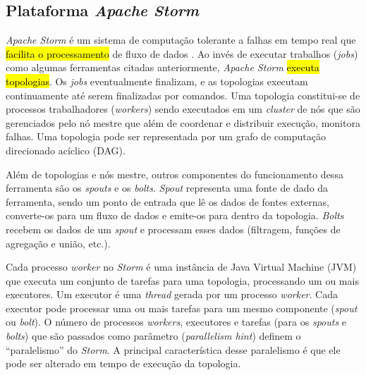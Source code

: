 \subsection{Plataforma \emph{Apache Storm}}

\emph{Apache Storm} é um sistema de computação tolerante a falhas em tempo
real que \hl{facilita o processamento} de fluxo de dados
\cite{ApacheStorm2020,Lopez2018}.
Ao invés de executar trabalhos (\emph{jobs}) como algumas ferramentas citadas
anteriormente, \emph{Apache Storm} \hl{executa topologias}.
Os \emph{jobs} eventualmente finalizam, e as topologias executam continuamente até
serem finalizadas por comandos.
Uma topologia constitui-se de processos trabalhadores (\emph{workers}) sendo executados
em um \emph{cluster} de nós que são gerenciados pelo nó mestre que além de
coordenar e distribuir execução, monitora falhas.
Uma topologia pode ser representada por um grafo de computação direcionado
acíclico (DAG).

Além de topologias e nós mestre, outros componentes do funcionamento dessa
ferramenta são os \emph{spouts} e os \emph{bolts}.
\emph{Spout} representa uma fonte de dado da ferramenta, sendo um ponto de
entrada que lê os dados de fontes externas, converte-os para um fluxo de dados e
emite-os para dentro da topologia.
\emph{Bolts} recebem os dados de um \emph{spout} e processam esses dados
(filtragem, funções de agregação e união, etc.).

Cada processo \emph{worker} no \emph{Storm} é uma instância de Java Virtual Machine (JVM)
que executa um conjunto de tarefas para uma topologia, processando um ou mais
executores.
Um executor é uma \emph{thread} gerada por um processo \emph{worker}.
Cada executor pode processar uma ou mais tarefas para um mesmo componente
(\emph{spout} ou \emph{bolt}).
O número de processos \emph{workers}, executores e tarefas (para os
\emph{spouts} e \emph{bolts}) que são passados como parâmetro (\emph{parallelism
hint}) definem o ``paralelismo'' do \emph{Storm}. A principal característica desse
paralelismo é que ele pode ser alterado em tempo de execução da topologia.



